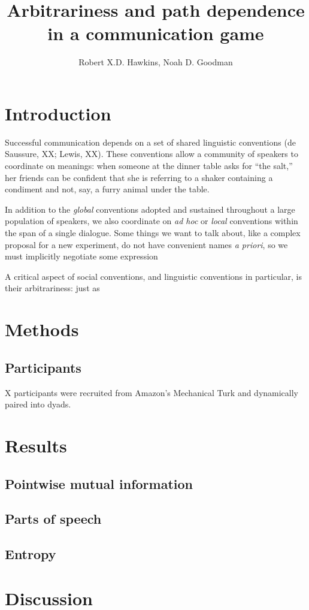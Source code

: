 \documentclass[12pt, floatsintext, jou]{apa6}
\title{Arbitrariness and path dependence in a communication game}
\author{Robert X.D. Hawkins, Noah D. Goodman}
\affiliation{Stanford University}
\begin{document}
\maketitle
\section{Introduction}

Successful communication depends on a set of shared linguistic conventions (de Saussure, XX; Lewis, XX). These conventions allow a community of speakers to coordinate on meanings: when someone at the dinner table asks for ``the salt,'' her friends can be confident that she is referring to a shaker containing a condiment and not, say, a furry animal under the table. 

In addition to the \emph{global} conventions adopted and sustained throughout a large population of speakers, we also coordinate on \emph{ad hoc} or \emph{local} conventions within the span of a single dialogue. Some things we want to talk about, like a complex proposal for a new experiment, do not have convenient names \emph{a priori}, so we must implicitly negotiate some expression 

A critical aspect of social conventions, and linguistic conventions in particular, is their arbitrariness: just as 



\section{Methods}

\subsection{Participants} 

X participants were recruited from Amazon's Mechanical Turk and dynamically paired into dyads. 

\section{Results}

\subsection{Pointwise mutual information}

\subsection{Parts of speech}

\subsection{Entropy}

\section{Discussion}





\end{document}

